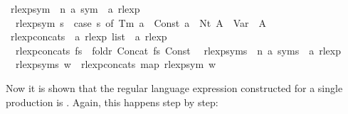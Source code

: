 \begin{isabellebody}
\begin{isamarkuptext}
\end{isamarkuptext}\isamarkuptrue%
\isamarkupfalse%
\ rlexp{\isacharunderscore}{\kern0pt}sym\ {\isacharcolon}{\kern0pt}{\isacharcolon}{\kern0pt}\ {\isachardoublequoteopen}{\isacharparenleft}{\kern0pt}{\isacharprime}{\kern0pt}n{\isacharcomma}{\kern0pt}\ {\isacharprime}{\kern0pt}a{\isacharparenright}{\kern0pt}\ sym\ {\isasymRightarrow}\ {\isacharprime}{\kern0pt}a\ rlexp{\isachardoublequoteclose}\ \isanewline
\ \ {\isachardoublequoteopen}rlexp{\isacharunderscore}{\kern0pt}sym\ s\ {\isacharequal}{\kern0pt}\ {\isacharparenleft}{\kern0pt}case\ s\ of\ Tm\ a\ {\isasymRightarrow}\ Const\ {\isacharbraceleft}{\kern0pt}{\isacharbrackleft}{\kern0pt}a{\isacharbrackright}{\kern0pt}{\isacharbraceright}{\kern0pt}\ {\isacharbar}{\kern0pt}\ Nt\ A\ {\isasymRightarrow}\ Var\ {\isacharparenleft}{\kern0pt}{\isasymgamma}{\isacharprime}{\kern0pt}\ A{\isacharparenright}{\kern0pt}{\isacharparenright}{\kern0pt}{\isachardoublequoteclose}\isanewline
\isanewline
{}\isamarkupfalse%
\ rlexp{\isacharunderscore}{\kern0pt}concats\ {\isacharcolon}{\kern0pt}{\isacharcolon}{\kern0pt}\ {\isachardoublequoteopen}{\isacharprime}{\kern0pt}a\ rlexp\ list\ {\isasymRightarrow}\ {\isacharprime}{\kern0pt}a\ rlexp{\isachardoublequoteclose}\ \isanewline
\ \ {\isachardoublequoteopen}rlexp{\isacharunderscore}{\kern0pt}concats\ fs\ {\isacharequal}{\kern0pt}\ foldr\ Concat\ fs\ {\isacharparenleft}{\kern0pt}Const\ {\isacharbraceleft}{\kern0pt}{\isacharbrackleft}{\kern0pt}{\isacharbrackright}{\kern0pt}{\isacharbraceright}{\kern0pt}{\isacharparenright}{\kern0pt}{\isachardoublequoteclose}\isanewline
\isanewline
{}\isamarkupfalse%
\ rlexp{\isacharunderscore}{\kern0pt}syms\ {\isacharcolon}{\kern0pt}{\isacharcolon}{\kern0pt}\ {\isachardoublequoteopen}{\isacharparenleft}{\kern0pt}{\isacharprime}{\kern0pt}n{\isacharcomma}{\kern0pt}\ {\isacharprime}{\kern0pt}a{\isacharparenright}{\kern0pt}\ syms\ {\isasymRightarrow}\ {\isacharprime}{\kern0pt}a\ rlexp{\isachardoublequoteclose}\ \isanewline
\ \ {\isachardoublequoteopen}rlexp{\isacharunderscore}{\kern0pt}syms\ w\ {\isacharequal}{\kern0pt}\ rlexp{\isacharunderscore}{\kern0pt}concats\ {\isacharparenleft}{\kern0pt}map\ rlexp{\isacharunderscore}{\kern0pt}sym\ w{\isacharparenright}{\kern0pt}{\isachardoublequoteclose}%
\begin{isamarkuptext}%
Now it is shown that the regular language expression constructed for a single production
is . Again, this happens step by step:%

\end{isamarkuptext}
\end{isabellebody}
